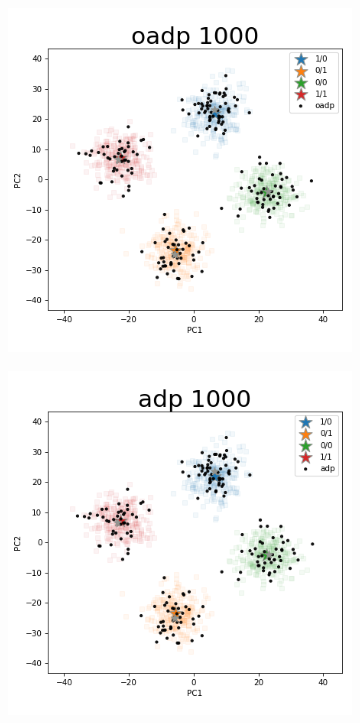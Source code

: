 \documentclass{article}
\begin{document}
\begin{figure}[p]
\begin{subfigure}{.5\textwidth}
\end{subfigure}
\hfill
\begin{subfigure}{.5\textwidth}
  \centering
  \includegraphics[width=.98\linewidth]{img/ggsim1000_100000_200_2_1_100_1_sturef_ggsim1000_100000_1000_2_1_100_0_oadp}
\end{subfigure}%
\begin{subfigure}{.5\textwidth}
  \centering
  \includegraphics[width=.98\linewidth]{img/ggsim1000_100000_200_2_1_100_1_sturef_ggsim1000_100000_1000_2_1_100_0_adp}
\end{subfigure}
\end{figure}
\end{document}
